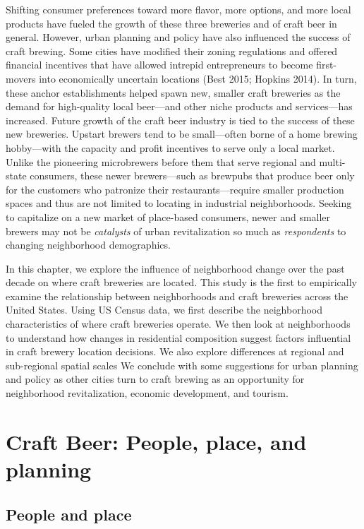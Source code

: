 \documentclass[]{article}
\begin{document}
Shifting consumer preferences toward more flavor, more options, and more
local products have fueled the growth of these three breweries and of
craft beer in general. However, urban planning and policy have also
influenced the success of craft brewing. Some cities have modified their
zoning regulations and offered financial incentives that have allowed
intrepid entrepreneurs to become first-movers into economically
uncertain locations (Best 2015; Hopkins 2014). In turn, these anchor
establishments helped spawn new, smaller craft breweries as the demand
for high-quality local beer---and other niche products and
services---has increased. Future growth of the craft beer industry is
tied to the success of these new breweries. Upstart brewers tend to be
small---often borne of a home brewing hobby---with the capacity and
profit incentives to serve only a local market. Unlike the pioneering
microbrewers before them that serve regional and multi-state consumers,
these newer brewers---such as brewpubs that produce beer only for the
customers who patronize their restaurants---require smaller production
spaces and thus are not limited to locating in industrial neighborhoods.
Seeking to capitalize on a new market of place-based consumers, newer
and smaller brewers may not be \emph{catalysts} of urban revitalization
so much as \emph{respondents} to changing neighborhood demographics.

In this chapter, we explore the influence of neighborhood change over
the past decade on where craft breweries are located. This study is the
first to empirically examine the relationship between neighborhoods and
craft breweries across the United States. Using US Census data, we first
describe the neighborhood characteristics of where craft breweries
operate. We then look at neighborhoods to understand how changes in
residential composition suggest factors influential in craft brewery
location decisions. We also explore differences at regional and
sub-regional spatial scales We conclude with some suggestions for urban
planning and policy as other cities turn to craft brewing as an
opportunity for neighborhood revitalization, economic development, and
tourism.

\section{Craft Beer: People, place, and
planning}\label{craft-beer-people-place-and-planning}

\subsection{People and place}\label{people-and-place}
\end{document}
